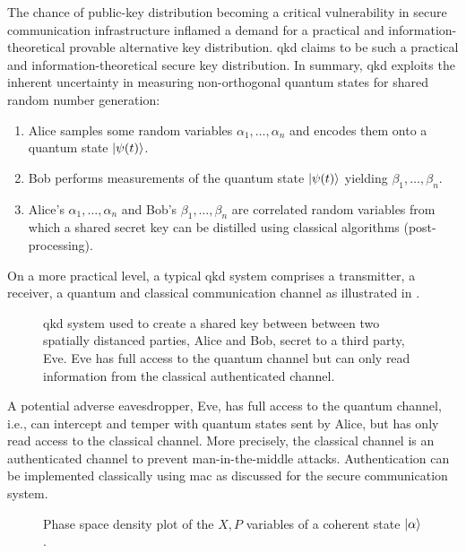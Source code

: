 The chance of public-key distribution becoming a critical vulnerability in secure communication infrastructure inflamed a demand for a practical and information-theoretical provable alternative key distribution.
\gls{qkd} claims to be such a practical and information-theoretical secure key distribution.
In summary, \gls{qkd} exploits the inherent uncertainty in measuring non-orthogonal quantum states for shared random number generation:
\begin{enumerate}
	\item Alice samples some random variables $\alpha_1,\dots,\alpha_n$ and encodes them onto a quantum state $\ket{\psi(t)}$.
	\item Bob performs measurements of the quantum state $\ket{\psi(t)}$ yielding $\beta_1,\dots,\beta_n$.
	\item Alice's $\alpha_1,\dots,\alpha_n$ and Bob's $\beta_1,\dots,\beta_n$ are correlated random variables from which a shared secret key can be distilled using classical algorithms (post-processing).
\end{enumerate}
On a more practical level, a typical \gls{qkd} system comprises a transmitter, a receiver, a quantum and classical communication channel as illustrated in .
\begin{figure}[htb]
	\centering
	
	\caption{\Gls{qkd} system used to create a shared key between between two spatially distanced parties, Alice and Bob, secret to a third party, Eve. Eve has full access to the quantum channel but can only read information from the classical authenticated channel.}\label{fig:qkd_system}
\end{figure}
A potential adverse eavesdropper, Eve, has full access to the quantum channel, i.e., can intercept and temper with quantum states sent by Alice, but has only read access to the classical channel.
More precisely, the classical channel is an authenticated channel to prevent man-in-the-middle attacks.
Authentication can be implemented classically using \gls{mac} as discussed for the secure communication system.




\begin{figure}[htb]
	\centering
	
	\caption{Phase space density plot of the $X,P$ variables of a coherent state $\ket{\alpha}$.}
\end{figure}